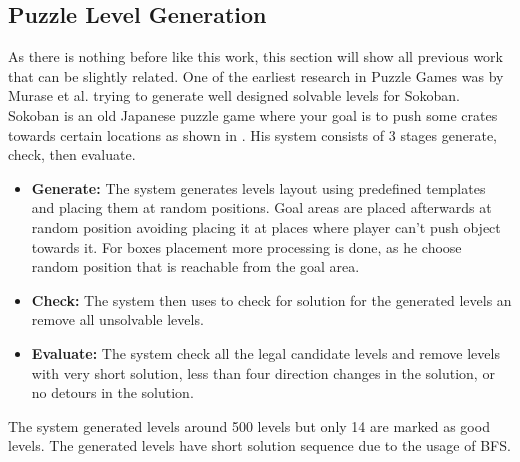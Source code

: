 \subsection{Puzzle Level Generation}
As there is nothing before like this work, this section will show all previous work that can be slightly related. One of the earliest research in Puzzle Games was by Murase et al.\cite{sokobanLevelGenerationOld} trying to generate well designed solvable levels for Sokoban\cite{sokoban}. Sokoban is an old Japanese puzzle game where your goal is to push some crates towards certain locations as shown in . His system consists of 3 stages generate, check, then evaluate.
\begin{itemize} \itemsep0pt \parskip0pt 
	\item \textbf{Generate:} The system generates levels layout using predefined templates and placing them at random positions. Goal areas are placed afterwards at random position avoiding placing it at places where player can't push object towards it. For boxes placement more processing is done, as he choose random position that is reachable from the goal area.
	\item \textbf{Check:} The system then uses  to check for solution for the generated levels an remove all unsolvable levels.
	\item \textbf{Evaluate:} The system check all the legal candidate levels and remove levels with very short solution, less than four direction changes in the solution, or no detours in the solution.
\end{itemize}
The system generated levels around 500 levels but only 14 are marked as good levels. The generated levels have short solution sequence due to the usage of BFS.\\\par

